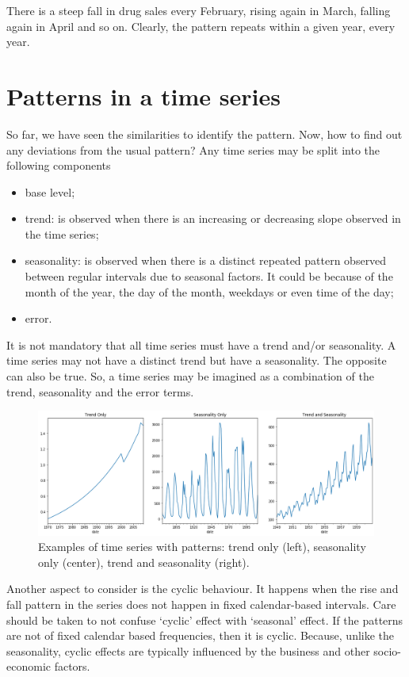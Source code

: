 There is a steep fall in drug sales every February, rising again in
March, falling again in April and so on. Clearly, the pattern repeats
within a given year, every year.

\section{Patterns in a time series}\label{patterns-in-a-time-series}

So far, we have seen the similarities to identify the pattern. Now, how
to find out any deviations from the usual pattern? Any time series may
be split into the following components

\begin{itemize}
\tightlist
\item
  base level;
\item
  trend: is observed when there is an increasing or decreasing slope
  observed in the time series;
\item
  seasonality: is observed when there is a distinct repeated pattern
  observed between regular intervals due to seasonal factors. It could
  be because of the month of the year, the day of the month, weekdays or
  even time of the day;
\item
  error.
\end{itemize}

It is not mandatory that all time series must have a trend and/or
seasonality. A time series may not have a distinct trend but have a
seasonality. The opposite can also be true. So, a time series may be
imagined as a combination of the trend, seasonality and the error terms.

\begin{figure}[htb]
	\centering
	\includegraphics[width=0.9\linewidth]{figures/time_series_patterns.png}
	\caption{Examples of time series with patterns: trend only (left), seasonality only (center), trend and seasonality (right).}
	\label{fig:time_series_patterns}
\end{figure}
    
Another aspect to consider is the cyclic behaviour. It happens when the
rise and fall pattern in the series does not happen in fixed
calendar-based intervals. Care should be taken to not confuse `cyclic'
effect with `seasonal' effect. If the patterns are not of fixed calendar
based frequencies, then it is cyclic. Because, unlike the seasonality,
cyclic effects are typically influenced by the business and other
socio-economic factors.

